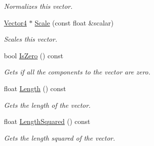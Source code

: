 \begin{DoxyCompactItemize}
\begin{DoxyCompactList}\small\item\em Normalizes this vector. \end{DoxyCompactList}\item 
\hyperlink{class_flounder_1_1_vector4}{Vector4} $\ast$ \hyperlink{class_flounder_1_1_vector4_aa90260bf193aff245370ca18664fa192}{Scale} (const float \&scalar)
\begin{DoxyCompactList}\small\item\em Scales this vector. \end{DoxyCompactList}\item 
bool \hyperlink{class_flounder_1_1_vector4_a118d1110bc0386ac6f25b5a2c28f1005}{Is\+Zero} () const
\begin{DoxyCompactList}\small\item\em Gets if all the components to the vector are zero. \end{DoxyCompactList}\item 
float \hyperlink{class_flounder_1_1_vector4_ad3eeab8d1e45aa98df0321b148c791c8}{Length} () const
\begin{DoxyCompactList}\small\item\em Gets the length of the vector. \end{DoxyCompactList}\item 
float \hyperlink{class_flounder_1_1_vector4_a2bf6a8432449892c513ecedec89ce573}{Length\+Squared} () const
\begin{DoxyCompactList}\small\item\em Gets the length squared of the vector. \end{DoxyCompactList}\end{DoxyCompactItemize}
